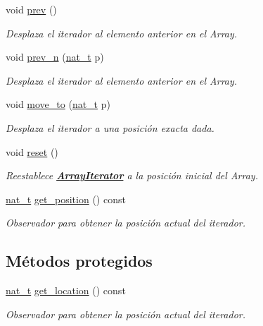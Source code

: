 \begin{DoxyCompactItemize}
void \hyperlink{class_designar_1_1_array_iterator_a5a0fd9640ab487a6034fec8f4f3d34cb}{prev} ()
\begin{DoxyCompactList}\small\item\em Desplaza el iterador al elemento anterior en el Array. \end{DoxyCompactList}\item 
void \hyperlink{class_designar_1_1_array_iterator_a5a417cab0b0b039c69d5a52a513a019f}{prev\+\_\+n} (\hyperlink{namespace_designar_aa72662848b9f4815e7bf31a7cf3e33d1}{nat\+\_\+t} p)
\begin{DoxyCompactList}\small\item\em Desplaza el iterador al elemento anterior en el Array. \end{DoxyCompactList}\item 
void \hyperlink{class_designar_1_1_array_iterator_a68f6d13686360c93d95b3a875b14312e}{move\+\_\+to} (\hyperlink{namespace_designar_aa72662848b9f4815e7bf31a7cf3e33d1}{nat\+\_\+t} p)
\begin{DoxyCompactList}\small\item\em Desplaza el iterador a una posición exacta dada. \end{DoxyCompactList}\item 
void \hyperlink{class_designar_1_1_array_iterator_af8781369a1cb13f92c8c2dbab9975118}{reset} ()
\begin{DoxyCompactList}\small\item\em Reestablece {\bfseries \hyperlink{class_designar_1_1_array_iterator}{Array\+Iterator}} a la posición inicial del Array. \end{DoxyCompactList}\item 
\hyperlink{namespace_designar_aa72662848b9f4815e7bf31a7cf3e33d1}{nat\+\_\+t} \hyperlink{class_designar_1_1_array_iterator_a209ca14a9628f0a67a258469d98089b8}{get\+\_\+position} () const
\begin{DoxyCompactList}\small\item\em Observador para obtener la posición actual del iterador. \end{DoxyCompactList}\end{DoxyCompactItemize}
\subsection*{Métodos protegidos}
\begin{DoxyCompactItemize}
\item 
\hyperlink{namespace_designar_aa72662848b9f4815e7bf31a7cf3e33d1}{nat\+\_\+t} \hyperlink{class_designar_1_1_array_iterator_a55fa01dfdb66a82b162ea2c9f631e2fd}{get\+\_\+location} () const
\begin{DoxyCompactList}\small\item\em Observador para obtener la posición actual del iterador. \end{DoxyCompactList}\end{DoxyCompactItemize}
